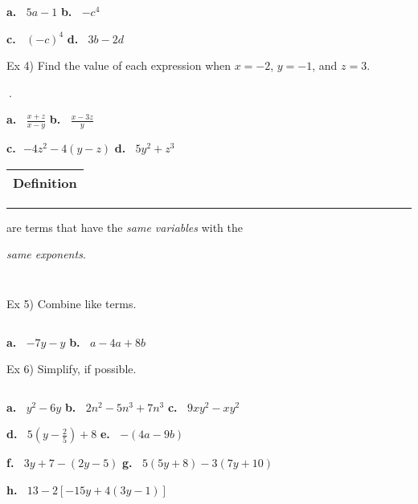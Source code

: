 \documentclass{ximera}
\begin{document}
$~$

\textbf{a.}$~~~~$$\displaystyle 5a-1$ \hspace{2.5in} \textbf{b.}$~~~~$$\displaystyle -c^4$

\vspace{.75in}

\textbf{c.}$~~~~$$\displaystyle (-c)^4$ \hspace{2.5in} \textbf{d.}$~~~~$$\displaystyle 3b-2d$

\vspace{.75in}

\noindent Ex 4)  Find the value of each expression when $x=-2$, $y=-1$, and $z=3$.

$~$.

\textbf{a.}$~~~~$$\displaystyle \frac{x+z}{x-y}$  \hspace{2.5in} \textbf{b.}$~~~~$$\displaystyle \frac{x-3z}{y}$

\vspace{.75in}

\textbf{c.}$~~~$$\displaystyle -4z^2-4(y-z)$ \hspace{2in} \textbf{d.}$~~~~$$\displaystyle 5y^2+z^3$

\pagebreak

\noindent \begin{tabular}{|c|}
\hline 
Definition\\
\hline 
\end{tabular} \rule{2in}{.5pt} are terms that have the \textit{same variables} with the 

\textit{same exponents}.

$~$

$~$

\noindent Ex 5) Combine like terms.

$~$

\textbf{a.}$~~~~$$\displaystyle -7y-y$ \hspace{2.5in} \textbf{b.}$~~~~$$\displaystyle a-4a+8b$

\vspace{.75in}

\noindent Ex 6) Simplify, if possible.

$~$

\textbf{a.}$~~~~$$\displaystyle y^2-6y$ \hspace{1.3in} \textbf{b.}$~~~~$$\displaystyle 2n^2-5n^3+7n^3$ \hspace{1.3in} \textbf{c.}$~~~~$$\displaystyle9xy^2-xy^2$

\vspace{2in}

\textbf{d.}$~~~~$$\displaystyle 5\left(y-\frac{2}{5}\right)+8$ \hspace{2.5in} \textbf{e.}$~~~~$$\displaystyle -(4a-9b)$

\vspace{2in}

\textbf{f.}$~~~~$$\displaystyle 3y+7-(2y-5)$ \hspace{2.5in} \textbf{g.}$~~~~$$\displaystyle 5(5y+8)-3(7y+10)$

\vspace{2in}

\textbf{h.}$~~~~$$\displaystyle 13-2[-15y+4(3y-1)]$
\end{document}
